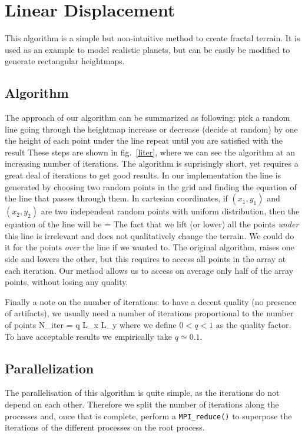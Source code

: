 \section{Linear Displacement}
This algorithm is a simple but non-intuitive method to create fractal terrain. It is used as an example to model realistic planets\cite{paulbourke}, but can be easily be modified to generate rectangular heightmaps.
\subsection{Algorithm}
The approach of our algorithm can be summarized as following:
\bi
    \ib pick a random line going through the heightmap
    \ib  increase or decrease (decide at random) by one the height of each point under the line
    \ib repeat until you are satisfied with the result
\ei
These steps are shown in fig.~\ref{liter}, where we can see the algorithm at an increasing number of iterations.
The algorithm is suprisingly short, yet requires a great deal of iterations to get good results.
In our implementation the line is generated by choosing two random points in the grid and finding the equation of the line that passes through them.
In cartesian coordinates, if $(x_1,y_1)$ and $(x_2,y_2)$ are two independent random points with uniform distribution, then the equation of the line will be
\be
    =
\ee
The fact that we lift (or lower) all the points {\em under} this line is irrelevant and does not qualitatively change the terrain.
We could do it for the points {\em over} the line if we wanted to.
The original algorithm\cite{paulbourke}, raises one side and lowers the other, but this requires to access all points in the array at each iteration. 
Our method allows us to access on average only half of the array points, without losing any quality.

Finally a note on the number of iterations: to have a decent quality (no presence of artifacts), we usually need a number of iterations proportional to the number of points
\be\label{Niter}
    N_{iter} = q L_x L_y
\ee
where we define $0<q<1$ as the quality factor. To have acceptable results we empirically take $q\simeq 0.1$.
\subsection{Parallelization}
The parallelisation of this algorithm is quite simple, as the iterations do not depend on each other.
Therefore we split the number of iterations along the processes and, once that is complete, perform a {\tt MPI\_reduce()} to superpose the iterations of the different processes on the root process.

